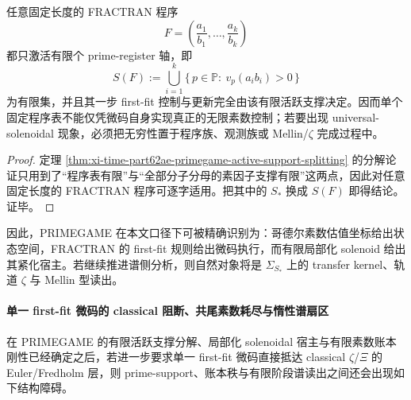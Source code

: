 \begin{corollary}\label{cor:xi-time-part62ae-fixed-fractran-finite-prime-support-rigidity}
任意固定长度的 FRACTRAN 程序
\[
F=\left(\frac{a_1}{b_1},\dots,\frac{a_k}{b_k}\right)
\]
都只激活有限个 prime-register 轴，即
\[
S(F):=\bigcup_{i=1}^k\{\,p\in \mathbb P:\ v_p(a_i b_i)>0\,\}
\]
为有限集，并且其一步 first-fit 控制与更新完全由该有限活跃支撑决定。因而单个固定程序表不能仅凭微码自身实现真正的无限素数控制；若要出现 universal-solenoidal 现象，必须把无穷性置于程序族、观测族或 Mellin/\(\zeta\) 完成过程中。
\end{corollary}
\begin{proof}
定理 \ref{thm:xi-time-part62ae-primegame-active-support-splitting} 的分解论证只用到了“程序表有限”与“全部分子分母的素因子支撑有限”这两点，因此对任意固定长度的 FRACTRAN 程序可逐字适用。把其中的 \(S_*\) 换成 \(S(F)\) 即得结论。证毕。
\end{proof}

因此，PRIMEGAME 在本文口径下可被精确识别为：哥德尔素数估值坐标给出状态空间，FRACTRAN 的 first-fit 规则给出微码执行，而有限局部化 solenoid 给出其紧化宿主。若继续推进谱侧分析，则自然对象将是 \(\Sigma_{S_*}\) 上的 transfer kernel、轨道 \(\zeta\) 与 Mellin 型读出。

\paragraph{单一 first-fit 微码的 classical 阻断、共尾素数耗尽与惰性谱扇区}
在 PRIMEGAME 的有限活跃支撑分解、局部化 solenoidal 宿主与有限素数账本刚性已经确定之后，若进一步要求单一 first-fit 微码直接抵达 classical \(\zeta\)/\(\Xi\) 的 Euler/Fredholm 层，则 prime-support、账本秩与有限阶段谱读出之间还会出现如下结构障碍。

